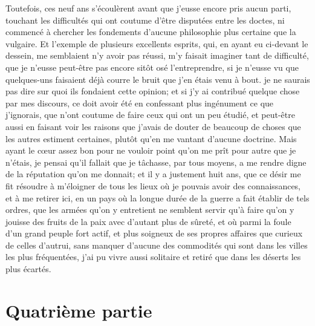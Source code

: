 \documentclass[french,twoside]{book} %
\newcommand\chapteropen{} %
\newcommand\chapterclose{} %
\begin{document}
Toutefois, ces neuf ans s'écoulèrent avant que j'eusse encore pris aucun parti, touchant les difficultés qui ont coutume d'être disputées entre les doctes, ni commencé à chercher les fondements d'aucune philosophie plus certaine que la vulgaire. Et l'exemple de plusieurs excellents esprits, qui, en ayant eu ci-devant le dessein, me semblaient n'y avoir pas réussi, m'y faisait imaginer tant de difficulté, que je n'eusse peut-être pas encore sitôt osé l'entreprendre, si je n'eusse vu que quelques-uns faisaient déjà courre le bruit que j'en étais venu à bout. je ne saurais pas dire sur quoi ils fondaient cette opinion; et si j'y ai contribué quelque chose par mes discours, ce doit avoir été en confessant plus ingénument ce que j'ignorais, que n'ont coutume de faire ceux qui ont un peu étudié, et peut-être aussi en faisant voir les raisons que j'avais de douter de beaucoup de choses que les autres estiment certaines, plutôt qu'en me vantant d'aucune doctrine. Mais ayant le cœur assez bon pour ne vouloir point qu'on me prît pour autre que je n'étais, je pensai qu'il fallait que je tâchasse, par tous moyens, a me rendre digne de la réputation qu'on me donnait; et il y a justement huit ans, que ce désir me fit résoudre à m'éloigner de tous les lieux où je pouvais avoir des connaissances, et à me retirer ici, en un pays où la longue durée de la guerre a fait établir de tels ordres, que les armées qu'on y entretient ne semblent servir qu'à faire qu'on y jouisse des fruits de la paix avec d'autant plus de sûreté, et où parmi la foule d'un grand peuple fort actif, et plus soigneux de ses propres affaires que curieux de celles d'autrui, sans manquer d'aucune des commodités qui sont dans les villes les plus fréquentées, j'ai pu vivre aussi solitaire et retiré que dans les déserts les plus écartés.
\chapterclose


\chapteropen
\renewcommand{\leftmark}{Quatrième partie}
\chapter[Quatrième partie]{Quatrième partie}
\end{document}
